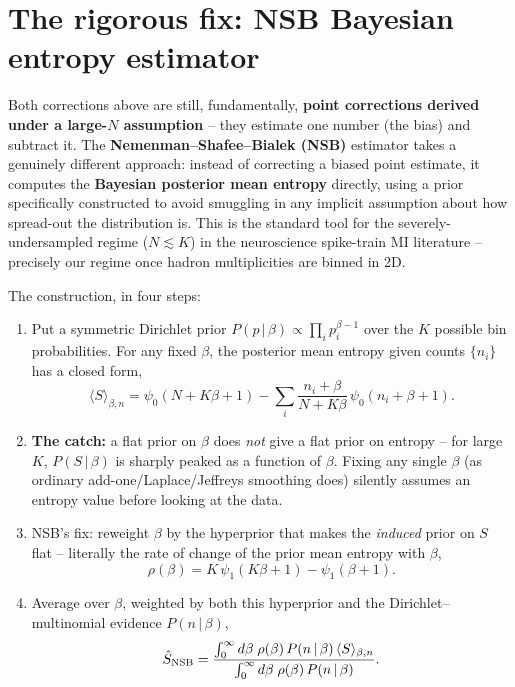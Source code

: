 \documentclass[11pt]{article}
\begin{document}
\section{The rigorous fix: NSB Bayesian entropy estimator}
\label{sec:nsb}

Both corrections above are still, fundamentally, \textbf{point corrections
derived under a large-$N$ assumption} -- they estimate one number (the
bias) and subtract it. The \textbf{Nemenman--Shafee--Bialek (NSB)}
estimator \cite{NSB2002} takes a genuinely different approach: instead of
correcting a biased point estimate, it computes the \textbf{Bayesian
posterior mean entropy} directly, using a prior specifically constructed
to avoid smuggling in any implicit assumption about how spread-out the
distribution is. This is the standard tool for the severely-undersampled
regime ($N\lesssim K$) in the neuroscience spike-train MI literature --
precisely our regime once hadron multiplicities are binned in 2D.

The construction, in four steps:

\begin{enumerate}
\item Put a symmetric Dirichlet prior $P(p\,|\,\beta)\propto\prod_i
p_i^{\beta-1}$ over the $K$ possible bin probabilities. For any fixed
$\beta$, the posterior mean entropy given counts $\{n_i\}$ has a closed
form,
\begin{equation}
\langle S\rangle_{\beta,n} = \psi_0(N+K\beta+1) -
\sum_i \frac{n_i+\beta}{N+K\beta}\,\psi_0(n_i+\beta+1).
\end{equation}

\item \textbf{The catch:} a flat prior on $\beta$ does \emph{not} give a
flat prior on entropy -- for large $K$, $P(S\,|\,\beta)$ is sharply peaked
as a function of $\beta$. Fixing any single $\beta$ (as ordinary
add-one/Laplace/Jeffreys smoothing does) silently assumes an entropy value
before looking at the data.

\item NSB's fix: reweight $\beta$ by the hyperprior that makes the
\emph{induced} prior on $S$ flat -- literally the rate of change of the
prior mean entropy with $\beta$,
\begin{equation}
\rho(\beta) = K\,\psi_1(K\beta+1) - \psi_1(\beta+1).
\end{equation}

\item Average over $\beta$, weighted by both this hyperprior and the
Dirichlet--multinomial evidence $P(n\,|\,\beta)$,
\begin{equation}
\hat S_{\rm NSB} =
\frac{\int_0^\infty d\beta\;\rho(\beta)\,P(n\,|\,\beta)\,\langle
S\rangle_{\beta,n}}
{\int_0^\infty d\beta\;\rho(\beta)\,P(n\,|\,\beta)}.
\end{equation}
\end{enumerate}
\end{document}
